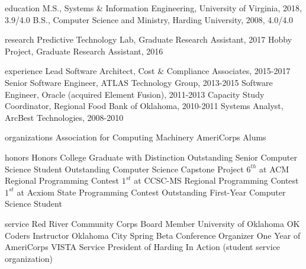 \documentclass[11pt,article,oneside]{memoir}
\def\myname{Mark Rucker}
\begin{document}
	\noindent{\LARGE\scheader \textsc{\myname}}
	\bigskip

	\begin{cvsection}{education}
		\ind M.S., Systems \& Information Engineering, University of Virginia, 2018, 3.9/4.0
		\ind B.S., Computer Science and Ministry, Harding University, 2008, 4.0/4.0
	\end{cvsection}

	\begin{cvsection}{research}		
		\ind Predictive Technology Lab, Graduate Research Assistant, 2017
		\ind Hobby Project, Graduate Research Assistant, 2016
	\end{cvsection}
	
	\begin{cvsection}{experience}
		\ind Lead Software Architect, Cost \& Compliance Associates, 2015-2017
		\ind Senior Software Engineer, ATLAS Technology Group, 2013-2015
		\ind Software Engineer, Oracle (acquired Element Fusion), 2011-2013
		\ind Capacity Study Coordinator, Regional Food Bank of Oklahoma, 2010-2011
		\ind Systems Analyst, ArcBest Technologies, 2008-2010
	\end{cvsection}
	
	\begin{cvsection}{organizations}
		\ind Association for Computing Machinery
		\ind AmeriCorps Alums
	\end{cvsection}
	
	\begin{cvsection}{honors}
		\ind Honors College Graduate with Distinction
		\ind Outstanding Senior Computer Science Student
		\ind Outstanding Computer Science Capstone Project
		\ind $6^{th}$ at ACM Regional Programming Contest
		\ind $1^{st}$ at CCSC-MS Regional Programming Contest
		\ind $1^{st}$ at Acxiom State Programming Contest
		\ind Outstanding First-Year Computer Science Student
	\end{cvsection}

	\begin{cvsection}{service}
		\ind Red River Community Corps Board Member
		\ind University of Oklahoma OK Coders Instructor
		\ind Oklahoma City Spring Beta Conference Organizer
		\ind One Year of AmeriCorps VISTA Service
		\ind President of Harding In Action (student service organization)
	\end{cvsection}

	
	\begin{comment}
	Paper published with Yu and Jackey
	Paper published with Kamwoo
	Poster session with for Autonomous Agent at CVDI Spring 2017
	Session chair for SIEDS Spring 2017
	UVA DSI Presidential Fellowship award
	\end{comment}
\end{document}

